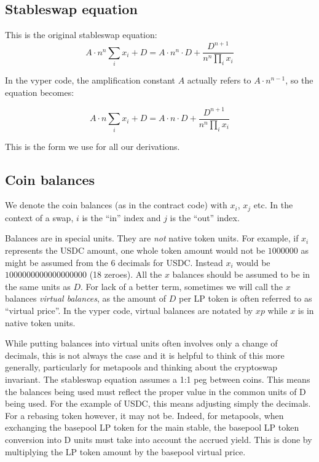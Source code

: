 \documentclass[
]{article}
\begin{document}
\hypertarget{stableswap-equation}{%
\subsection{Stableswap equation}\label{stableswap-equation}}

This is the original stableswap equation:
\[ A \cdot n^n  \sum_i x_i + D = A \cdot n^n \cdot D + \frac{D^{n+1}}{n^n \prod_i x_i}\]

In the vyper code, the amplification constant \(A\) actually refers to
\(A \cdot n^{n-1}\), so the equation becomes:

\[ A \cdot n  \sum_i x_i + D = A \cdot n \cdot D + \frac{D^{n+1}}{n^n \prod_i x_i}\]

This is the form we use for all our derivations.

\hypertarget{coin-balances}{%
\subsection{Coin balances}\label{coin-balances}}

We denote the coin balances (as in the contract code) with \(x_i\),
\(x_j\) etc. In the context of a swap, \(i\) is the ``in'' index and
\(j\) is the ``out'' index.

Balances are in special units. They are \emph{not} native token units.
For example, if \(x_i\) represents the USDC amount, one whole token
amount would not be \(1000000\) as might be assumed from the 6 decimals
for USDC. Instead \(x_i\) would be \(1000000000000000000\) (18 zeroes).
All the \(x\) balances should be assumed to be in the same units as
\(D\). For lack of a better term, sometimes we will call the \(x\)
balances \emph{virtual balances}, as the amount of \(D\) per LP token is
often referred to as ``virtual price''. In the vyper code, virtual
balances are notated by \(xp\) while \(x\) is in native token units.

While putting balances into virtual units often involves only a change
of decimals, this is not always the case and it is helpful to think of
this more generally, particularly for metapools and thinking about the
cryptoswap invariant. The stableswap equation assumes a 1:1 peg between
coins. This means the balances being used must reflect the proper value
in the common units of D being used. For the example of USDC, this means
adjusting simply the decimals. For a rebasing token however, it may not
be. Indeed, for metapools, when exchanging the basepool LP token for the
main stable, the basepool LP token conversion into D units must take
into account the accrued yield. This is done by multiplying the LP token
amount by the basepool virtual price.
\end{document}
